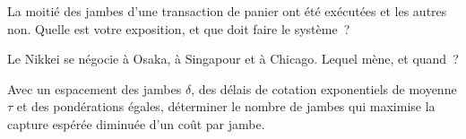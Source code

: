 \begin{interviewq}\label{iq:hf:index-and-basket-arbitrage:4}
La moitié des jambes d'une transaction de panier ont été exécutées et les autres non. Quelle est votre exposition, et que doit faire le système~?
\end{interviewq}

\begin{interviewq}\label{iq:hf:index-and-basket-arbitrage:5}
Le Nikkei se négocie à Osaka, à Singapour et à Chicago. Lequel mène, et quand~?
\end{interviewq}

\begin{interviewq}\label{iq:hf:index-and-basket-arbitrage:6}
Avec un espacement des jambes $\delta$, des délais de cotation exponentiels de moyenne $\tau$ et des pondérations égales, déterminer le nombre de jambes
qui maximise la capture espérée diminuée d'un coût par jambe.
\end{interviewq}
